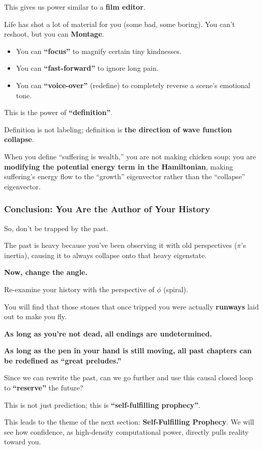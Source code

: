 This gives us power similar to a \textbf{film editor}.

Life has shot a lot of material for you (some bad, some boring). You can't reshoot, but you can \textbf{Montage}.

\begin{itemize}
\item You can \textbf{``focus''} to magnify certain tiny kindnesses.

\item You can \textbf{``fast-forward''} to ignore long pain.

\item You can \textbf{``voice-over''} (redefine) to completely reverse a scene's emotional tone.
\end{itemize}

This is the power of \textbf{``definition''}.

Definition is not labeling; definition is \textbf{the direction of wave function collapse}.

When you define ``suffering is wealth,'' you are not making chicken soup; you are \textbf{modifying the potential energy term in the Hamiltonian}, making suffering's energy flow to the ``growth'' eigenvector rather than the ``collapse'' eigenvector.

\subsubsection{Conclusion: You Are the Author of Your History}

So, don't be trapped by the past.

The past is heavy because you've been observing it with old perspectives ($\pi$'s inertia), causing it to always collapse onto that heavy eigenstate.

\textbf{Now, change the angle.}

Re-examine your history with the perspective of $\phi$ (spiral).

You will find that those stones that once tripped you were actually \textbf{runways} laid out to make you fly.

\textbf{As long as you're not dead, all endings are undetermined.}

\textbf{As long as the pen in your hand is still moving, all past chapters can be redefined as ``great preludes.''}

Since we can rewrite the past, can we go further and use this causal closed loop to \textbf{``reserve''} the future?

This is not just prediction; this is \textbf{``self-fulfilling prophecy''}.

This leads to the theme of the next section: \textbf{Self-Fulfilling Prophecy}. We will see how confidence, as high-density computational power, directly pulls reality toward you.


